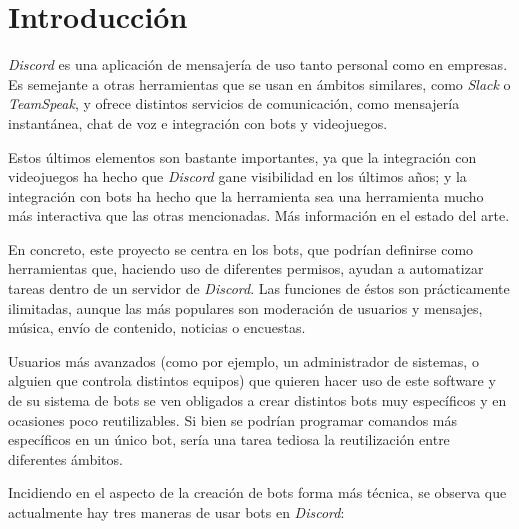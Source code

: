 \chapter{Introducción}

\textit{Discord}\cite{discord} es una aplicación de mensajería de uso tanto personal como en empresas. Es semejante a otras herramientas que se usan en ámbitos similares, como \textit{Slack}\cite{slack} o \textit{TeamSpeak}\cite{teamspeak}, y ofrece distintos servicios de comunicación, como mensajería instantánea, chat de voz e integración con bots y videojuegos.

Estos últimos elementos son bastante importantes, ya que la integración con videojuegos ha hecho que \textit{Discord} gane visibilidad en los últimos años; y la integración con bots ha hecho que la herramienta sea una herramienta mucho más interactiva que las otras mencionadas. Más información en el estado del arte.

En concreto, este proyecto se centra en los bots, que podrían definirse como herramientas que, haciendo uso de diferentes permisos, ayudan a automatizar tareas dentro de un servidor de \textit{Discord}. Las funciones de éstos son prácticamente ilimitadas, aunque las más populares son moderación de usuarios y mensajes, música, envío de contenido, noticias o encuestas.

\bigskip

Usuarios más avanzados (como por ejemplo, un administrador de sistemas, o alguien que controla distintos equipos) que quieren hacer uso de este software y de su sistema de bots se ven obligados a crear distintos bots muy específicos y en ocasiones poco reutilizables. Si bien se podrían programar comandos más específicos en un único bot, sería una tarea tediosa la reutilización entre diferentes ámbitos.

Incidiendo en el aspecto de la creación de bots forma más técnica, se observa que actualmente hay tres maneras de usar bots en \textit{Discord}:

